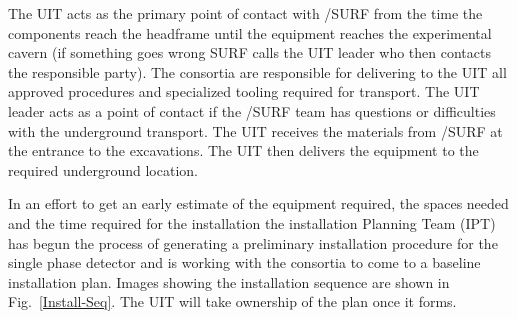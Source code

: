 The UIT acts as the primary point of contact with /SURF from the
time the components reach the headframe until the equipment reaches
the experimental cavern (if something goes wrong SURF calls the UIT
leader who then contacts the responsible party). The consortia are
responsible for delivering to the UIT all approved procedures and
specialized tooling required for transport. The UIT leader acts as a
point of contact if the /SURF team has questions or difficulties
with the underground transport.  The UIT receives the materials from
/SURF at the entrance to the  excavations. The UIT then
delivers the equipment to the required underground location.

In an effort to get an early estimate of the equipment required, the
spaces needed and the time required for the installation the
installation Planning Team (IPT) has begun the process of generating a
preliminary installation procedure for the single phase detector and
is working with the consortia to come to a baseline installation
plan. Images showing the installation sequence are shown in
Fig.~\ref{Install-Seq}. The UIT will take ownership of the plan once
it forms.  

